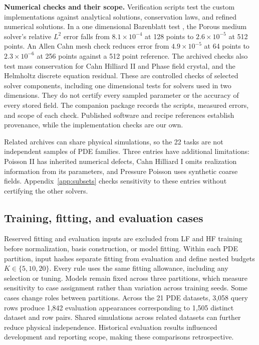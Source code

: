 \label{app:generatorchecks}
\noindent\textbf{Numerical checks and their scope.}
Verification scripts test the custom implementations against analytical
solutions, conservation laws, and refined numerical solutions. In a one
dimensional Barenblatt test \citep{vazquez2007}, the Porous medium solver's
relative $L^2$ error falls from $8.1\times10^{-4}$ at 128 points to
$2.6\times10^{-5}$ at 512 points. An Allen Cahn mesh check reduces error
from $4.9\times10^{-5}$ at 64 points to $2.3\times10^{-6}$ at 256 points
against a 512 point reference. The archived checks also test mass conservation
for Cahn Hilliard II and Phase field crystal, and the Helmholtz discrete
equation residual. These are controlled checks of selected solver components,
including one dimensional tests for solvers used in two dimensions. They do
not certify every sampled parameter or the accuracy of every stored field.
The companion package records the scripts, measured errors, and scope of
each check. Published software and recipe references establish provenance,
while the implementation checks are our own.

Related archives can share physical simulations, so the 22 tasks are not
independent samples of PDE families. Three entries have additional limitations:
Poisson II has inherited numerical defects, Cahn Hilliard I omits realization
information from its parameters, and Pressure Poisson uses synthetic coarse
fields. Appendix~\ref{app:subsets} checks sensitivity to these entries without
certifying the other solvers.

\subsection{Training, fitting, and evaluation cases}
\label{app:splits}
Reserved fitting and evaluation inputs are excluded from LF and HF training
before normalization, basis construction, or model fitting. Within each PDE
partition, input hashes separate fitting from evaluation and define nested
budgets $K\in\{5,10,20\}$. Every rule uses the same fitting allowance, including
any selection or tuning. Models remain fixed across three partitions, which
measure sensitivity to case assignment rather than variation across training
seeds. Some cases change roles between partitions. Across the 21 PDE datasets,
3,058 query rows produce 1,842 evaluation appearances corresponding to 1,505
distinct dataset and row pairs. Shared simulations across related datasets can
further reduce physical independence. Historical evaluation results influenced
development and reporting scope, making these comparisons retrospective.


